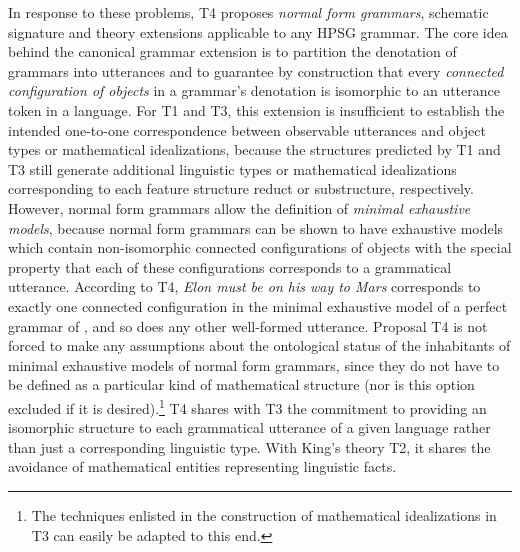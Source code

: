 \documentclass[output=paper
 	        ,biblatex
                ,babelshorthands
                ,newtxmath
                ,draftmode
                ,colorlinks, citecolor=brown
]{langscibook}
\begin{document}
{In response to these problems, T4 proposes \emph{normal form
  grammars}, schematic signature and theory extensions applicable to
any HPSG grammar. The core idea behind the canonical grammar extension
is to partition the denotation of grammars into utterances and to
guarantee by construction that every \emph{connected configuration of
  objects} in a grammar's denotation is isomorphic to an utterance
token in a language. For T1 and T3, this extension is insufficient to
establish the intended one-to-one correspondence between observable
utterances and object types or mathematical idealizations, because the
structures predicted by T1 and T3 still generate additional linguistic
types or mathematical idealizations corresponding to each feature
structure reduct or substructure, respectively. However, normal form
grammars allow the definition of \emph{minimal exhaustive models},
because normal form grammars can be shown to have exhaustive models
which contain non-isomorphic connected configurations of objects with
the special property that each of these configurations corresponds to
a grammatical utterance. According to T4, \emph{Elon must be on his way
  to Mars} corresponds to exactly one connected configuration in the
minimal exhaustive model of a perfect grammar of , and so does
any other well-formed  utterance. Proposal T4
is not forced to make any assumptions about the ontological status of
the inhabitants of minimal exhaustive models of normal form grammars,
since they do not have to be defined as a particular kind of
mathematical structure (nor is this option excluded if it is
desired).\footnote{The techniques enlisted in the construction of
mathematical idealizations in T3 can easily be adapted to this end.} T4 shares with T3 the commitment to providing an isomorphic
structure to each grammatical utterance of a given language rather
than just a corresponding linguistic type. With King's theory T2, it
shares the avoidance of mathematical entities representing linguistic
facts.

}
\end{document}
